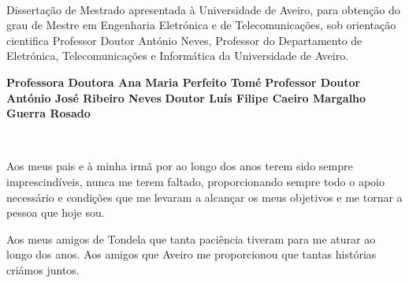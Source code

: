 \TitlePage

  \HEADER{\BAR}
         {\ThesisYear}
  \TITLE{\myName}
        {\TituloTese}
        {\ThesisTitle}
\EndTitlePage
\titlepage\ \endtitlepage %


%
%

\TitlePage
  \HEADER{}{\ThesisYear}
  \TITLE{\myName}
        {\TituloTese}
        {\ThesisTitle}
  \vskip 15mm
  \TEXT{}
       {Dissertação de Mestrado apresentada à Universidade de Aveiro, para obtenção do grau de Mestre em Engenharia Eletrónica e de Telecomunicações, sob orientação cientifica Professor Doutor António Neves, Professor do Departamento de Eletrónica, Telecomunicações e Informática da Universidade de Aveiro.}
\EndTitlePage
\titlepage\ \endtitlepage %

\TitlePage
  \vspace*{55mm}
       {}
       {\textbf{Professora Doutora Ana Maria Perfeito Tomé}}
  \vspace*{5mm}
       {\textbf{Professor Doutor António José Ribeiro Neves}}
  \vspace*{5mm}
  \TEXT{}
       {\textbf{Doutor Luís Filipe Caeiro Margalho Guerra Rosado}}
  \vspace*{5mm}
  
\EndTitlePage
\titlepage\ \endtitlepage %

\TitlePage
  \vspace*{55mm}
       {Aos meus pais e à minha irmã por ao longo dos anos terem sido sempre imprescindíveis, nunca me terem faltado, proporcionando sempre todo o apoio necessário e condições que me levaram a alcançar os meus objetivos e me tornar a pessoa que hoje sou.}
  
  \TEXT{}
       {Aos meus amigos de Tondela que tanta paciência tiveram para me aturar ao longo dos anos.}
       \TEXT{}
       {Aos amigos que Aveiro me proporcionou que tantas histórias criámos juntos.}

